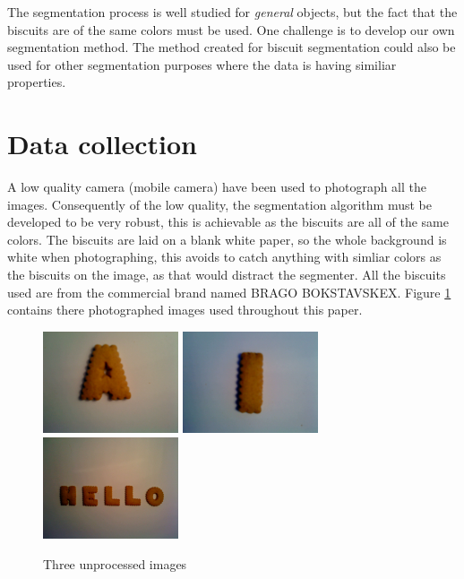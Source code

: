 \documentclass[a4paper,11pt]{article}
\begin{document}
The segmentation process is well studied for \emph{general} objects, but the fact that the biscuits are of the same colors must be used.
One challenge is to develop our own segmentation method.
The method created for biscuit segmentation could also be used for other segmentation purposes where the data is having similiar properties.

\section{Data collection}
A low quality camera (mobile camera) have been used to photograph all the images.
Consequently of the low quality, the segmentation algorithm must be developed to be very robust, this is achievable as the biscuits are all of the same colors.
The biscuits are laid on a blank white paper, so the whole background is white when photographing, this avoids to catch anything with simliar colors as the biscuits on the image, as that would distract the segmenter.
All the biscuits used are from the commercial brand named BRAGO BOKSTAVSKEX.
Figure \ref{fig:unprocessed} contains there photographed images used throughout this paper.

\begin{figure}[]
\begin{center}
\includegraphics[width=40mm]{orig_a.JPG}
\includegraphics[width=40mm]{orig_i.JPG}
\includegraphics[width=40mm]{orig_word.JPG}
\caption{Three unprocessed images}
\end{center}
\label{fig:unprocessed}
\end{figure}
\end{document}
